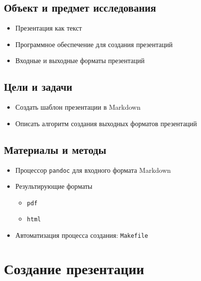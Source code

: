 \documentclass[
  letterpaper,
  DIV=11,
  numbers=noendperiod]{scrartcl}
\providecommand{\tightlist}{%
  \setlength{\itemsep}{0pt}\setlength{\parskip}{0pt}}\usepackage{longtable,booktabs,array}
\begin{document}
\subsection{Объект и предмет
исследования}\label{ux43eux431ux44aux435ux43aux442-ux438-ux43fux440ux435ux434ux43cux435ux442-ux438ux441ux441ux43bux435ux434ux43eux432ux430ux43dux438ux44f}

\begin{itemize}
\tightlist
\item
  Презентация как текст
\item
  Программное обеспечение для создания презентаций
\item
  Входные и выходные форматы презентаций
\end{itemize}

\subsection{Цели и
задачи}\label{ux446ux435ux43bux438-ux438-ux437ux430ux434ux430ux447ux438}

\begin{itemize}
\tightlist
\item
  Создать шаблон презентации в Markdown
\item
  Описать алгоритм создания выходных форматов презентаций
\end{itemize}

\subsection{Материалы и
методы}\label{ux43cux430ux442ux435ux440ux438ux430ux43bux44b-ux438-ux43cux435ux442ux43eux434ux44b}

\begin{itemize}
\tightlist
\item
  Процессор \texttt{pandoc} для входного формата Markdown
\item
  Результирующие форматы

  \begin{itemize}
  \tightlist
  \item
    \texttt{pdf}
  \item
    \texttt{html}
  \end{itemize}
\item
  Автоматизация процесса создания: \texttt{Makefile}
\end{itemize}

\section{Создание
презентации}\label{ux441ux43eux437ux434ux430ux43dux438ux435-ux43fux440ux435ux437ux435ux43dux442ux430ux446ux438ux438}
\end{document}
